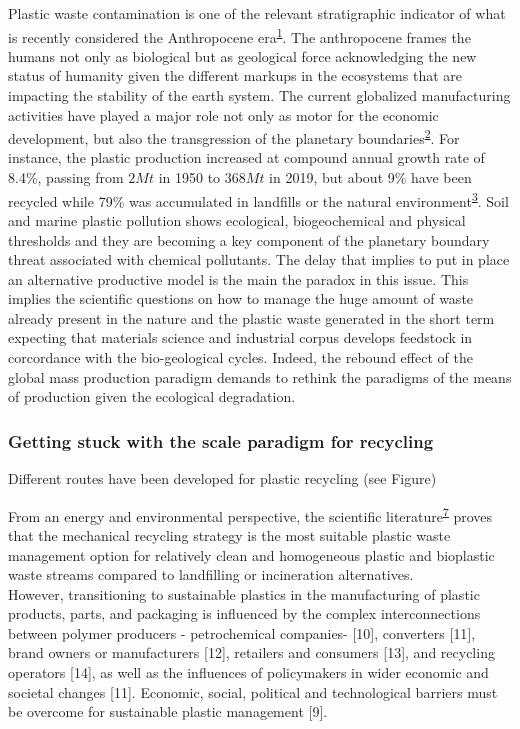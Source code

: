 \documentclass[
  11pt,
  a4paperpaper,
  onecolumn]{article}
\begin{document}
Plastic waste contamination is one of the relevant stratigraphic
indicator of what is recently considered the Anthropocene
era\textsuperscript{\protect\hyperlink{ref-de-la-torre2021}{1}}. The
anthropocene frames the humans not only as biological but as geological
force acknowledging the new status of humanity given the different
markups in the ecosystems that are impacting the stability of the earth
system. The current globalized manufacturing activities have played a
major role not only as motor for the economic development, but also the
transgression of the planetary
boundaries\textsuperscript{\protect\hyperlink{ref-ONeill2018}{2}}. For
instance, the plastic production increased at compound annual growth
rate of 8.4\%, passing from \(2Mt\) in 1950 to \(368Mt\) in 2019, but
about 9\% have been recycled while 79\% was accumulated in landfills or
the natural
environment\textsuperscript{\protect\hyperlink{ref-Geyer2017}{3}}. Soil
and marine plastic pollution shows ecological, biogeochemical and
physical thresholds and they are becoming a key component of the
planetary boundary threat associated with chemical pollutants. The delay
that implies to put in place an alternative productive model is the main
the paradox in this issue. This implies the scientific questions on how
to manage the huge amount of waste already present in the nature and the
plastic waste generated in the short term expecting that materials
science and industrial corpus develops feedstock in corcordance with the
bio-geological cycles. Indeed, the rebound effect of the global mass
production paradigm demands to rethink the paradigms of the means of
production given the ecological degradation.

\hypertarget{getting-stuck-with-the-scale-paradigm-for-recycling}{%
\subsubsection{Getting stuck with the scale paradigm for
recycling}\label{getting-stuck-with-the-scale-paradigm-for-recycling}}

Different routes have been developed for plastic recycling (see Figure)

From an energy and environmental perspective, the scientific
literature\textsuperscript{\protect\hyperlink{ref-Piemonte2011}{7}}
proves that the mechanical recycling strategy is the most suitable
plastic waste management option for relatively clean and homogeneous
plastic and bioplastic waste streams compared to landfilling or
incineration alternatives.\\
However, transitioning to sustainable plastics in the manufacturing of
plastic products, parts, and packaging is influenced by the complex
interconnections between polymer producers - petrochemical companies-
{[}10{]}, converters {[}11{]}, brand owners or manufacturers {[}12{]},
retailers and consumers {[}13{]}, and recycling operators {[}14{]}, as
well as the influences of policymakers in wider economic and societal
changes {[}11{]}. Economic, social, political and technological barriers
must be overcome for sustainable plastic management {[}9{]}.
\end{document}

